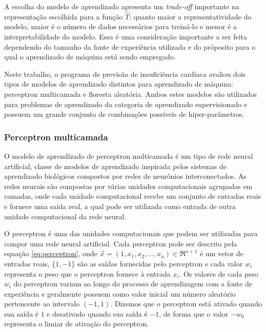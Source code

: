 A escolha do modelo de aprendizado apresenta um \textit{trade-off} importante na representação escolhida para a função $\hat{T}$: quanto maior a representatividade do modelo, maior é o número de dados necessários para treiná-lo\cite[p.8]{machine_learning} e menor é a interpretabilidade do modelo\cite[p.25]{statistical_learning}. Essa é uma consideração importante a ser feita dependendo do tamanho da fonte de experiência utilizada e do próposito para o qual o aprendizado de máquina está sendo empregado.

Neste trabalho, o programa de previsão de insuficiência cardíaca avaliou dois tipos de modelos de aprendizado distintos para aprendizado de máquina: perceptron multicamada e floresta aleatória. Ambos estes modelos são utilizados para problemas de aprendizado da categoria de aprendizado supervisionado e possuem um grande conjunto de combinações possíveis de hiper-parâmetros.

\subsubsection{Perceptron multicamada}

O modelo de aprendizado de perceptron multicamada é um tipo de rede neural artificial, classe de modelos de aprendizado inspirada pelos sistemas de aprendizado biológicos compostos por redes de neurônios interconectados. As redes neurais são compostas por várias unidades computacionais agrupadas em camadas, onde cada unidade computacional recebe um conjunto de entradas reais e fornece uma saída real, a qual pode ser utilizada como entrada de outra unidade computacional da rede neural\cite[p.82]{machine_learning}.

O perceptron é uma das unidades computacionais que podem ser utilizadas para compor uma rede neural artificial. Cada perceptron pode ser descrito pela equação \ref{eq:perceptron}, onde $\vec{x} = (1, x_{1}, x_{2}, ..., x_{n}) \in \Re^{n+1}$ é um vetor de entradas reais, $\{1, -1\}$ são as saídas fornecidas pelo perceptron e cada valor $w_{i}$ representa o peso que o perceptron fornece à entrada $x_{i}$. Os valores de cada peso $w_{i}$ do perceptron variam ao longo do processo de aprendizagem com a fonte de experiência e geralmente possuem como valor inicial um número aleatório pertencente ao intervalo $(-1, 1)$. Dizemos que o perceptron está ativado quando sua saída é $1$ e desativado quando sua saída é $-1$, de forma que o valor $-w_{0}$ representa o limiar de ativação do perceptron\cite[p.86]{machine_learning}.

